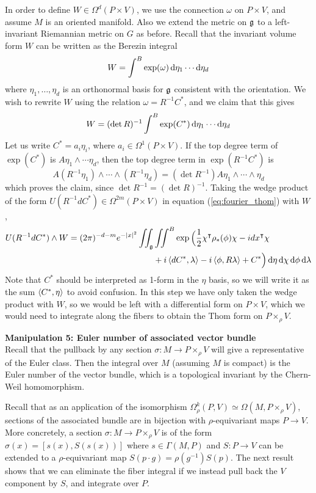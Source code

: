 In order to define $W\in \Omega^d(P\times V)$, we use the connection $\omega$ 
on $P\times V$, and assume $M$ is an oriented manifold. Also we
extend the metric on  $\operatorname{\mathfrak{g}}$ to a left-invariant Riemannian metric on $G$ as before.
Recall that the invariant volume form $W$ can be written as the Berezin integral
\[
W = \int^B \exp(\omega) \odif{\eta_1}\cdots \odif{\eta_d}
\] 
where $\eta_1,\ldots,\eta_d$ is an orthonormal basis for $\operatorname{\mathfrak{g}}$ consistent with
the orientation. We wish to rewrite $W$ using the relation $\omega = R^{-1}C^*$,
and we claim that this gives 
\[
W = (\det R)^{-1}\int^B \exp(C^*) \odif{\eta_1}\cdots \odif{\eta_d}
\] 
Let us write $C^* = a_i\eta_i$, where  $a_i \in \Omega^1(P\times V)$. 
If the top degree term of $\exp(C^*)$ is  $A \eta_1\wedge\cdots\eta_d$, then
the top degree term in $\exp(R^{-1}C^*)$ is 
\[
A (R^{-1}\eta_1)\wedge\cdots\wedge(R^{-1}\eta_d)
=(\det R^{-1}) A \eta_1\wedge\cdots\wedge\eta_d
\] 
which proves the claim, since $\det R^{-1} = (\det R)^{-1}$.
Taking the wedge product of the form 
$U(R^{-1}dC^*) \in \Omega^{2m}(P\times V)$ in equation 
(\ref{eq:fourier_thom}) with $W$,
\begin{align} \label{eq:AJ_formula_thom}
U(R^{-1}dC^*)\wedge W	
= (2\pi)^{-d-m}e^{-\abs{x}^2}\iint_{\g}&\iint^B 
	\exp\Big(\frac{1}{2}\chi^{\intercal}\rho_*(\phi)\chi - idx^\intercal \chi\\
	&+i\gen{dC^*,\lambda}-i\gen{\phi,R\lambda} + C^*\Big)  \odif{\eta}
	\odif{\chi} \odif{\phi}\odif{\lambda}  \nonumber 
\end{align}
Note that $C^*$ should be interpreted as 1-form in the $\eta$ basis,
so we will write it as the sum $\gen{C^*,\eta}$ to avoid confusion.
In this step we have only taken the wedge product with $W$, so we would be left 
with a differential form on  $P\times V$, which we would need to integrate along 
the fibers to obtain the Thom form on $P\times_\rho V$. 

\vspace{1ex}\noindent
\textbf{Manipulation 5: Euler number of associated vector bundle} \\
Recall that the pullback by any section $\sigma:M\to P\times_\rho V$ will give a
representative of the Euler class. 
Then the integral over $M$ (assuming $M$ is compact) is the Euler number of the 
vector bundle, which is a topological invariant by the Chern-Weil homomorphism. 

Recall that as an application of the isomorphism $\Omega_\rho^k(P,V)\simeq
\Omega(M,P\times_\rho V)$, sections of the associated bundle are in bijection
with $\rho$-equivariant maps  $P\to V$. More concretely, a section $\sigma :
M\to P\times_\rho V$ is of the form $\sigma(x) = 
[s(x),S(s(x))]$ where $s\in\Gamma(M,P)$ and  $S:P \to V$ can be extended
to a $\rho$-equivariant map $S(p\cdot g)=\rho(g^{-1})S(p)$. The next result
shows that 
we can eliminate the fiber integral if we instead pull back the $V$ component
by $S$, and integrate over $P$. 

